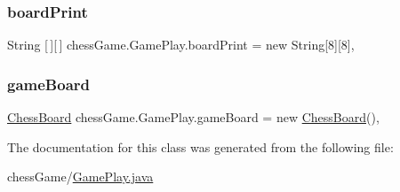 \subsubsection{\texorpdfstring{board\+Print}{boardPrint}}
{\footnotesize\ttfamily String \mbox{[}$\,$\mbox{]}\mbox{[}$\,$\mbox{]} chess\+Game.\+Game\+Play.\+board\+Print = new String\mbox{[}8\mbox{]}\mbox{[}8\mbox{]}\hspace{0.3cm}{\ttfamily [static]}, {\ttfamily [private]}}

\hypertarget{classchess_game_1_1_game_play_ab465d3af100bd584fa473e5cd0b06b78}{}\label{classchess_game_1_1_game_play_ab465d3af100bd584fa473e5cd0b06b78} 
\subsubsection{\texorpdfstring{game\+Board}{gameBoard}}
{\footnotesize\ttfamily \hyperlink{classchess_game_1_1_chess_board}{Chess\+Board} chess\+Game.\+Game\+Play.\+game\+Board = new \hyperlink{classchess_game_1_1_chess_board}{Chess\+Board}()\hspace{0.3cm}{\ttfamily [static]}, {\ttfamily [private]}}



The documentation for this class was generated from the following file\+:\begin{DoxyCompactItemize}
\item 
chess\+Game/\hyperlink{_game_play_8java}{Game\+Play.\+java}\end{DoxyCompactItemize}
